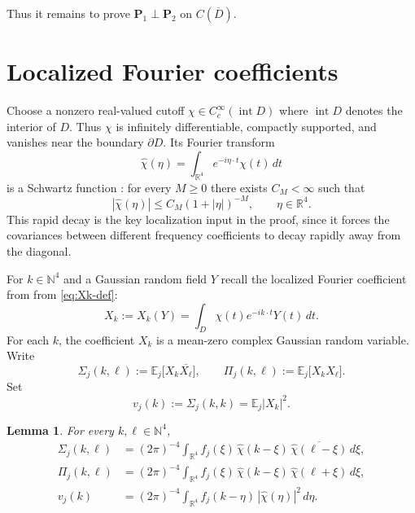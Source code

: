 \documentclass[11pt, reqno]{amsart}
\newtheorem{lemma}{Lemma}
\theoremstyle{remark}
\newcommand{\R}{\mathbb{R}}
\newcommand{\N}{\mathbb{N}}
\newcommand{\E}{\mathbb{E}}
\newcommand{\1}{\mathbf{1}}
\newcommand{\abs}[1]{\left\lvert #1 \right\rvert}
\newcommand{\what}[1]{\widehat{#1}}
\begin{document}
Thus it remains to prove $\mathbf P_1\perp \mathbf P_2$ on $C(\overline D)$.

\section{Localized Fourier coefficients}

Choose a nonzero real-valued cutoff $\chi\in C_c^\infty(\operatorname{int}D)$ where $\operatorname{int}D$
denotes the interior of $D$.
Thus $\chi$ is infinitely differentiable, compactly supported, and vanishes near the boundary $\partial D$.
Its Fourier transform
\[
\widehat{\chi}(\eta)=\int_{\mathbb R^4} e^{-i\eta\cdot t}\chi(t)\,dt
\]
is a Schwartz function \cite[Theorem 1.13]{duo2024fourier}: for every $M\ge 0$ there exists $C_M<\infty$ such that
\begin{equation}\label{eqn:rapid}
|\widehat{\chi}(\eta)|\le C_M(1+|\eta|)^{-M},
\qquad \eta\in\mathbb R^4.
\end{equation}
This rapid decay is the key localization input in the proof, since it forces the covariances between
different frequency coefficients to decay rapidly away from the diagonal.

For $k\in\N^4$ and a Gaussian random field $Y$ recall the localized Fourier coefficient from from \eqref{eq:Xk-def}:
\begin{equation}
X_k := X_k(Y) = \int_D \chi(t)e^{-ik\cdot t}Y(t)\,dt .
\end{equation}
For each $k$, the coefficient $X_k$ is a mean-zero complex Gaussian random variable.
Write
\begin{equation}\label{eqn:sigmapi}
\Sigma_j(k,\ell):=\E_j\big[X_k\overline{X_\ell}\big],
\qquad
\Pi_j(k,\ell):=\E_j\big[X_k X_\ell\big].
\end{equation}
Set
\[
v_j(k):=\Sigma_j(k,k)=\E_j\abs{X_k}^2.
\]
\begin{lemma}\label{lem:cov-formulas}
For every $k,\ell\in\N^4$,
\begin{align}
\Sigma_j(k,\ell)
&=(2\pi)^{-4}\int_{\R^4} f_j(\xi)\,\what\chi(k-\xi)\,\overline{\what\chi(\ell-\xi)}\,d\xi,
\label{eq:Sigma-formula}
\\
\Pi_j(k,\ell)
&=(2\pi)^{-4}\int_{\R^4} f_j(\xi)\,\what\chi(k-\xi)\,\what\chi(\ell+\xi)\,d\xi,
\label{eq:Pi-formula}
\\
v_j(k)
&=(2\pi)^{-4}\int_{\R^4} f_j(k-\eta)\,\abs{\what\chi(\eta)}^2\,d\eta.
\label{eq:vi-formula}
\end{align}
\end{lemma}
\end{document}
